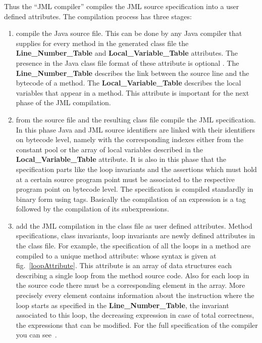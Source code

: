 Thus the ``JML compiler'' compiles the JML source specification into a user defined attributes. The compilation process has three stages:
\begin{enumerate}
\item compile the Java source file. This can be done by any Java compiler that supplies for every method in the generated class file the \textbf{Line\_Number\_Table} and \textbf{Local\_Variable\_Table}  attributes.
 The presence in the Java class file format of these attribute is optional \cite{VMSpec}. The \textbf{Line\_Number\_Table} describes the link between the source line and the bytecode of a method.  The \textbf{Local\_Variable\_Table} describes the local variables that appear in a method. This attribute is important for the next phase of the JML compilation.
\item from the source file and the resulting class file compile the JML specification. In this phase Java and JML source identifiers are linked with their identifiers on bytecode level, namely with the corresponding indexes either from the constant pool or the array of local variables described in the \textbf{Local\_Variable\_Table} attribute. It is also in this phase that the specification parts like the loop invariants and the assertions which must hold at a certain source program point must be associated to the respective program point on bytecode level. The specification
is compiled standardly in binary form using tags. Basically the compilation of an expression is a tag followed by the compilation of its subexpressions. 


\item add the JML compilation in the class file as user defined attributes. Method specifications, class invariants, loop invariants are 
newly defined attributes in the class file.
 For example, the specification of all the loops in a method are compiled to a unique method attribute: whose syntax is given at fig.~\ref{loopAttribute}. This attribute is an array of data structures each describing a single loop from the method source code. Also for each loop in the source code there must be a corresponding element in the array. 
More precisely every element contains information about the instruction where the loop starts as specified in the \textbf{Line\_Number\_Table}, the invariant associated to this loop, the decreasing expression in case of total correctness, the expressions that can be modified. 
For the full specification of the compiler you can see~\cite{JML2BCSpec}.
\end{enumerate}

